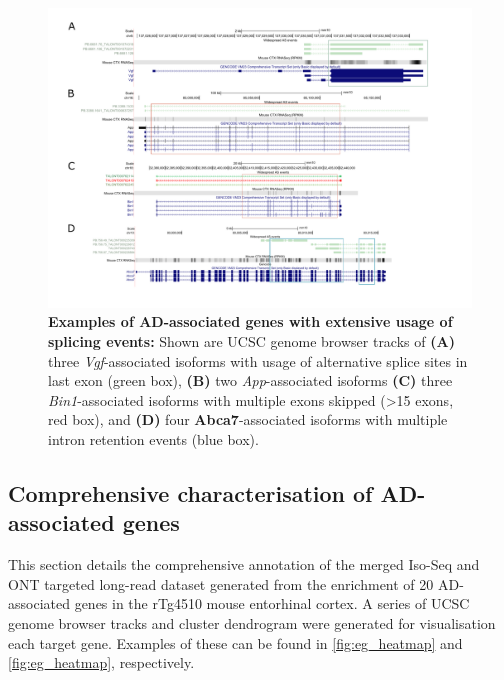 \begin{landscape}
\begin{figure}[]
	\centering
	\includegraphics[page=1,trim={0 1.5cm 0 1cm},clip,scale = 0.85]{Figures/TargetGenesASExamples.pdf}
	\captionsetup{width=1.25\textwidth}
	\caption[Examples of AD-associated genes with extensive usage of splicing events]%
	{\textbf{Examples of AD-associated genes with extensive usage of splicing events:} Shown are UCSC genome browser tracks of \textbf{(A)} three \textit{Vgf}-associated isoforms with usage of alternative splice sites in last exon (green box), \textbf{(B)} two \textit{App}-associated isoforms \textbf{(C)} three \textit{Bin1}-associated isoforms with multiple exons skipped (>15 exons, red box), and \textbf{(D)} four \textbf{Abca7}-associated isoforms with multiple intron retention events (blue box).}
	\label{fig: AS_Examples}
\end{figure}
\end{landscape}
\restoregeometry

\clearpage
\subsection{Comprehensive characterisation of AD-associated genes} 
\label{ch6: target_gene_annotation}
This section details the comprehensive annotation of the merged Iso-Seq and ONT targeted long-read dataset generated from the enrichment of 20 AD-associated genes in the rTg4510 mouse entorhinal cortex. A series of UCSC genome browser tracks and cluster dendrogram were generated for visualisation each target gene. Examples of these can be found in \cref{fig:eg_heatmap} and \cref{fig:eg_heatmap}, respectively. 

